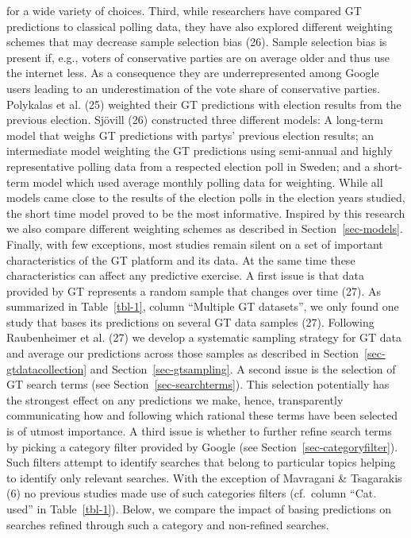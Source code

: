 \documentclass[
  letterpaper,
  DIV=11,
  numbers=noendperiod]{scrartcl}
\begin{document}
for a wide variety of choices. Third, while researchers have compared GT
predictions to classical polling data, they have also explored different
weighting schemes that may decrease sample selection bias (26). Sample
selection bias is present if, e.g., voters of conservative parties are
on average older and thus use the internet less. As a consequence they
are underrepresented among Google users leading to an underestimation of
the vote share of conservative parties. Polykalas et al. (25) weighted
their GT predictions with election results from the previous election.
Sjövill (26) constructed three different models: A long-term model that
weighs GT predictions with partys' previous election results; an
intermediate model weighting the GT predictions using semi-annual and
highly representative polling data from a respected election poll in
Sweden; and a short-term model which used average monthly polling data
for weighting. While all models came close to the results of the
election polls in the election years studied, the short time model
proved to be the most informative. Inspired by this research we also
compare different weighting schemes as described in
Section~\ref{sec-models}. Finally, with few exceptions, most studies
remain silent on a set of important characteristics of the GT platform
and its data. At the same time these characteristics can affect any
predictive exercise. A first issue is that data provided by GT
represents a random sample that changes over time (27). As summarized in
Table~\ref{tbl-1}, column ``Multiple GT datasets'', we only found one
study that bases its predictions on several GT data samples (27).
Following Raubenheimer et al. (27) we develop a systematic sampling
strategy for GT data and average our predictions across those samples as
described in Section~\ref{sec-gtdatacollection} and
Section~\ref{sec-gtsampling}. A second issue is the selection of GT
search terms (see Section~\ref{sec-searchterms}). This selection
potentially has the strongest effect on any predictions we make, hence,
transparently communicating how and following which rational these terms
have been selected is of utmost importance. A third issue is whether to
further refine search terms by picking a category filter provided by
Google (see Section~\ref{sec-categoryfilter}). Such filters attempt to
identify searches that belong to particular topics helping to identify
only relevant searches. With the exception of Mavragani \& Tsagarakis
(6) no previous studies made use of such categories filters (cf.~column
``Cat. used'' in Table~\ref{tbl-1}). Below, we compare the impact of
basing predictions on searches refined through such a category and
non-refined searches.
\end{document}
